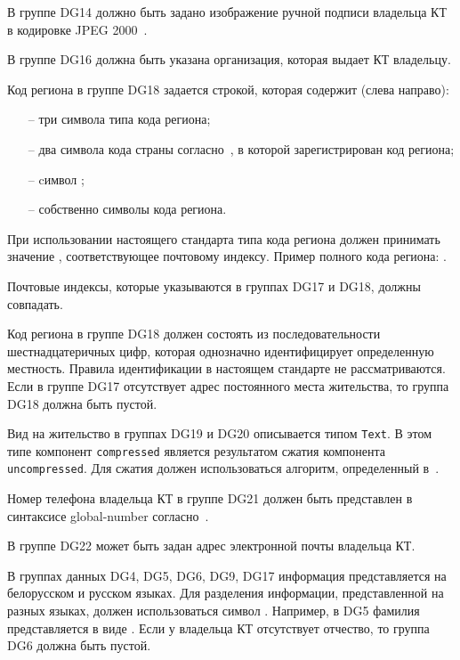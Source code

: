 
В группе DG14 должно быть задано изображение ручной подписи
владельца КТ в кодировке JPEG 2000~\cite{JPEG2000}.

В группе DG16 должна быть указана организация, которая выдает КТ владельцу. 

Код региона в группе DG18 задается строкой, которая содержит
(слева направо):
\begin{itemize}
\item[--]
три символа типа кода региона;
\item[--]
два символа кода страны согласно~\cite{CountryCodes}, 
в которой зарегистрирован код региона;
\item[--]
cимвол \str{-}; 
\item[--]
собственно символы кода региона.
\end{itemize}

При использовании настоящего стандарта типа кода региона
должен принимать значение , соответствующее
почтовому индексу. Пример полного кода региона: .

Почтовые индексы, которые указываются в группах DG17 и DG18,
должны совпадать.

Код региона в группе DG18 должен состоять из последовательности 
шестнадцатеричных цифр, которая однозначно идентифицирует определенную 
местность. Правила идентификации в настоящем стандарте не рассматриваются. 
Если в группе DG17 отсутствует адрес постоянного места жительства, то 
группа DG18 должна быть пустой. 
\fi


Вид на жительство в группах DG19 и DG20 описывается типом \verb|Text|. 
В этом типе компонент \verb|compressed| является результатом сжатия компонента 
\verb|uncompressed|. Для сжатия должен использоваться алгоритм, 
определенный в~\cite{DEFLATE}. 
\fi

Номер телефона владельца КТ в группе DG21 должен быть
представлен в синтаксисе global-number согласно~\cite{RFC3966}. 

В группе DG22 может быть задан адрес электронной почты владельца КТ. 

В группах данных DG4, DG5, DG6, DG9, DG17 информация
представляется на белорусском и русском языках.
Для разделения информации, представленной на разных языках,
должен использоваться символ \str{/}. Например, в DG5 фамилия 
представляется в виде .
Если у владельца КТ отсутствует отчество, то группа DG6 должна быть пустой. 

